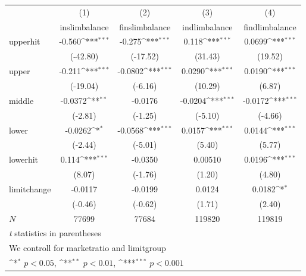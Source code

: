 {
\def\sym#1{\ifmmode^{#1}\else\(^{#1}\)\fi}
\begin{tabular}{l*{4}{c}}
\hline\hline
            &\multicolumn{1}{c}{(1)}&\multicolumn{1}{c}{(2)}&\multicolumn{1}{c}{(3)}&\multicolumn{1}{c}{(4)}\\
            &\multicolumn{1}{c}{inslimbalance}&\multicolumn{1}{c}{finslimbalance}&\multicolumn{1}{c}{indlimbalance}&\multicolumn{1}{c}{findlimbalance}\\
\hline
upperhit    &      -0.560\sym{***}&      -0.275\sym{***}&       0.118\sym{***}&      0.0699\sym{***}\\
            &    (-42.80)         &    (-17.52)         &     (31.43)         &     (19.52)         \\
[1em]
upper       &      -0.211\sym{***}&     -0.0802\sym{***}&      0.0290\sym{***}&      0.0190\sym{***}\\
            &    (-19.04)         &     (-6.16)         &     (10.29)         &      (6.87)         \\
[1em]
middle      &     -0.0372\sym{**} &     -0.0176         &     -0.0204\sym{***}&     -0.0172\sym{***}\\
            &     (-2.81)         &     (-1.25)         &     (-5.10)         &     (-4.66)         \\
[1em]
lower       &     -0.0262\sym{*}  &     -0.0568\sym{***}&      0.0157\sym{***}&      0.0144\sym{***}\\
            &     (-2.44)         &     (-5.01)         &      (5.40)         &      (5.77)         \\
[1em]
lowerhit    &       0.114\sym{***}&     -0.0350         &     0.00510         &      0.0196\sym{***}\\
            &      (8.07)         &     (-1.76)         &      (1.20)         &      (4.80)         \\
[1em]
limitchange &     -0.0117         &     -0.0199         &      0.0124         &      0.0182\sym{*}  \\
            &     (-0.46)         &     (-0.62)         &      (1.71)         &      (2.40)         \\
\hline
\(N\)       &       77699         &       77684         &      119820         &      119819         \\
\hline\hline
\multicolumn{5}{l}{\footnotesize \textit{t} statistics in parentheses}\\
\multicolumn{5}{l}{\footnotesize We controll for marketratio and limitgroup}\\
\multicolumn{5}{l}{\footnotesize \sym{*} \(p<0.05\), \sym{**} \(p<0.01\), \sym{***} \(p<0.001\)}\\
\end{tabular}
}
